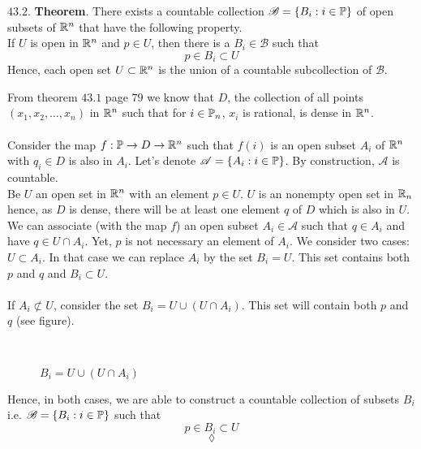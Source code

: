 \begin{tcolorbox}[colback=white]
$\mathbf{43.2.}$ \textbf{Theorem}. There exists a countable collection $\mathscr{B} = \{B_i:i\in\mathbb{P}\}$ of open subsets of $\mathbb{R}^n$ that have the following property.\\
If $U$ is open in $\mathbb{R}^n$ and $p\in U$, then there is a $B_i\in  \mathscr{B}$ such that
$$p\in B_i \subset U$$
Hence, each open set $ U \subset \mathbb{R}^n$ is the union of a countable subcollection of $\mathscr{B}$.
\end{tcolorbox}
From theorem $\mathbf{43.1}$ page $79$ we know that  $D$, the collection of all points $(x_1,x_2,\dots,x_n)$ in $\mathbb{R}^n$ such that for $i\in\mathbb{P}_n$, $x_i$ is rational, is dense in $\mathbb{R}^n$. \\\\
Consider the map $f:\mathbb{P}\rightarrow D\rightarrow \mathbb{R}^n$ such that $f(i)$ is an open  subset $A_i$ of $\mathbb{R}^n$ with $q_i\in D$ is also in $A_i$. Let's denote $\mathscr{A}=\{A_i:i\in\mathbb{P}\}$. By construction, $\mathscr{A}$ is countable.\\
Be $U$ an open set in $\mathbb{R}^n$ with an element $p\in U$.  $U$ is an nonempty open set in $\mathbb{R}_n$ hence, as $D$ is dense, there will be at least one element $q$ of $D$ which is also in $U$. We can associate (with the map $f$) an open subset $A_i\in \mathscr{A}$  such that $q\in A_i$ and have $q\in U\cap A_i$. 
Yet, $p$ is not necessary an element of $A_i$. We consider two cases:\\
$U\subset A_i$. In that case we can replace $A_i$ by the set $B_i=U$. This set contains both $p$ and $q$ and $B_i\subset U$.
\\\\
If $A_i\not \subset U$, consider the set $B_i= U\cup(U\cap A_i)$. This set will contain both $p$ and $q$  (see figure).
\begin{figure}[H]%
    \centering
\\
\caption{$B_i= U\cup(U\cap A_i)$}
\label{fig:fig_p8a}
\end{figure}
Hence, in both cases,  we are able to construct a countable collection of  subsets $B_i$ i.e. $\mathscr{B} = \{B_i:i\in\mathbb{P}\}$ such that $$p\in B_i\subset U$$
$$\lozenge$$
\newpage

